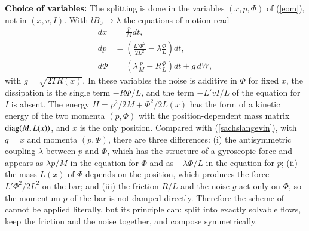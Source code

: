 \documentclass[11pt]{article}
\begin{document}
{\bf Choice of variables:} The splitting is done in the variables $(x,p,\Phi)$ of (\ref{eom}), not in $(x,v,I)$. With $l B_0\to\lambda$ the equations of motion read
\begin{align}
  dx&=\frac{p}{M}dt,\nonumber\\
  dp&=\left(\frac{L'\Phi^2}{2L^2}-\lambda\frac{\Phi}{L}\right)dt,\nonumber\\
  d\Phi&=\left(\lambda\frac{p}{M}-R\frac{\Phi}{L}\right)dt+g\,dW,
  \label{eomxpphi}
\end{align}
with $g=\sqrt{2TR(x)}$. In these variables the noise is additive in $\Phi$ for fixed $x$, the dissipation is the single term $-R\Phi/L$, and the term $-L'vI/L$ of the equation for $I$ is absent. The energy $H=p^2/2M+\Phi^2/2L(x)$ has the form of a kinetic energy of the two momenta $(p,\Phi)$ with the position-dependent mass matrix ${\rm diag}(M,L(x))$, and $x$ is the only position. Compared with (\ref{sachslangevin}), with $q=x$ and momenta $(p,\Phi)$, there are three differences: (i) the antisymmetric coupling $\lambda$ between $p$ and $\Phi$, which has the structure of a gyroscopic force and appears as $\lambda p/M$ in the equation for $\Phi$ and as $-\lambda\Phi/L$ in the equation for $p$; (ii) the mass $L(x)$ of $\Phi$ depends on the position, which produces the force $L'\Phi^2/2L^2$ on the bar; and (iii) the friction $R/L$ and the noise $g$ act only on $\Phi$, so the momentum $p$ of the bar is not damped directly. Therefore the scheme of \cite{sachs} cannot be applied literally, but its principle can: split into exactly solvable flows, keep the friction and the noise together, and compose symmetrically.
\end{document}
